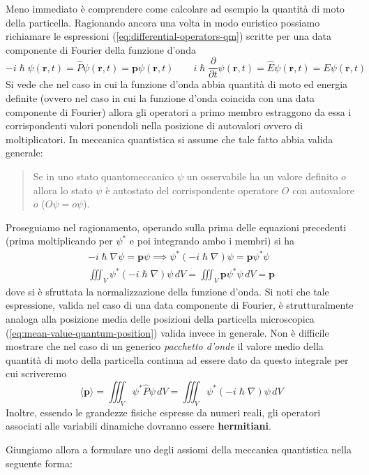 Meno immediato è comprendere come calcolare ad esempio la quantità di
moto della particella.
Ragionando ancora una volta in modo euristico
possiamo richiamare le espressioni (\ref{eq:differential-operators-qm}) scritte per
una data componente di Fourier della funzione d'onda
\[
    - i \hslash \psi(\bm{r},t) = \hat{P} \psi(\bm{r},t) = \bm{p} \psi(\bm{r},t) \qquad
    i \hslash \frac{\partial}{\partial t} \psi(\bm{r},t) = \hat{E}\psi(\bm{r},t)= E\psi(\bm{r},t)
\] Si vede che nel caso in cui la funzione d'onda abbia quantità di moto
ed energia definite (ovvero nel caso in cui la funzione d'onda coincida
con una data componente di Fourier) allora gli operatori a primo membro
estraggono da essa i corrispondenti valori ponendoli nella posizione di
autovalori ovvero di moltiplicatori.
In meccanica quantistica si assume
che tale fatto abbia valida generale:
\begin{quote}
    Se in uno stato quantomeccanico \(\psi\) un osservabile ha un valore
    definito \(o\) allora lo stato \(\psi\) è autostato del corrispondente
    operatore \(O\) con autovalore \(o\) (\(O \psi = o \psi\)).
\end{quote}

Proseguiamo nel ragionamento, operando sulla prima delle equazioni
precedenti (prima moltiplicando per \(\psi^{*}\) e poi integrando ambo i
membri) si ha
\begin{gather*}
    - i \hslash \nabla \psi = \bm{p} \psi \implies
    \psi^{*}(-i \hslash \nabla) \psi = \bm{p} \psi^{*}\psi\\
    \iiint_{V} \psi^{*}(-i \hslash \nabla) \psi \, dV = \iiint_{V} \bm{p} \psi^{*}\psi \, dV = \bm{p}
\end{gather*} dove si è sfruttata la normalizzazione della funzione d'onda.
Si noti
che tale espressione, valida nel caso di una data componente di Fourier,
è strutturalmente analoga alla posizione media delle posizioni della
particella microscopica (\ref{eq:mean-value-quantum-position}) valida invece in generale.
Non è difficile mostrare che nel caso di un generico \emph{pacchetto d'onde} il
valore medio della quantità di moto della particella continua ad essere
dato da questo integrale per cui scriveremo
\[
    \langle \bm{p}\rangle = \iiint_{V} \psi^{*}\hat{P}\psi \, dV = \iiint_{V} \psi^{*}(- i \hslash \nabla )\psi \, dV
\] Inoltre, essendo le grandezze fisiche espresse da numeri reali, gli
operatori associati alle variabili dinamiche dovranno essere
\textbf{hermitiani}.

Giungiamo allora a formulare uno degli assiomi della meccanica
quantistica nella seguente forma:

